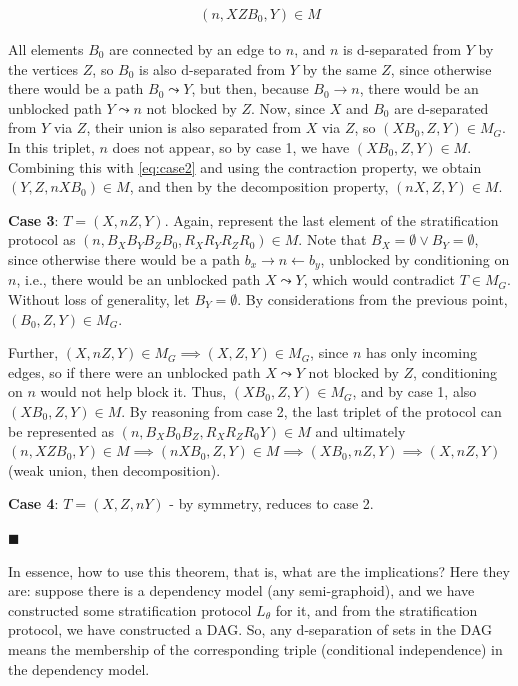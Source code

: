 \documentclass[fleqn]{article}
\numberwithin{equation}{section}
\numberwithin{theorem}{section}
\numberwithin{figure}{section}
\numberwithin{lemma}{section}
\numberwithin{corollary}{section}
\begin{document}
\begin{align}
	(n, X Z B_0, Y) \in M
	\label{eq:case2}
\end{align}

All elements \( B_0 \) are connected by an edge to \( n \), and \( n \) is d-separated from \( Y \) by the vertices \( Z \), so \( B_0 \) is also d-separated from \( Y \) by the same \( Z \), since otherwise there would be a path \( B_0 \leadsto Y \), but then, because \( B_0 \rightarrow n \), there would be an unblocked path \( Y \leadsto n \) not blocked by \( Z \). Now, since \( X \) and \( B_0 \) are d-separated from \( Y \) via \( Z \), their union is also separated from \( X \) via \( Z \), so \( (X B_0, Z, Y) \in M_G \). In this triplet, \( n \) does not appear, so by case 1, we have \( (X B_0, Z, Y) \in M \). Combining this with \ref{eq:case2} and using the contraction property, we obtain \( (Y, Z, n X B_0) \in M \), and then by the decomposition property, \( (n X, Z, Y) \in M \).

\textbf{Case 3}: \( T = (X, n Z, Y) \). Again, represent the last element of the stratification protocol as \( (n, B_X B_Y B_Z B_0, R_X R_Y R_Z R_0) \in M \). Note that \( B_X = \emptyset \lor B_Y = \emptyset \), since otherwise there would be a path \( b_x \rightarrow n \leftarrow b_y \), unblocked by conditioning on \( n \), i.e., there would be an unblocked path \( X \leadsto Y \), which would contradict \( T \in M_G \). Without loss of generality, let \( B_Y = \emptyset \). By considerations from the previous point, \( (B_0, Z, Y) \in M_G \).

Further, \( (X, n Z, Y) \in M_G \implies (X, Z, Y) \in M_G \), since \( n \) has only incoming edges, so if there were an unblocked path \( X \leadsto Y \) not blocked by \( Z \), conditioning on \( n \) would not help block it. Thus, \( (X B_0, Z, Y) \in M_G \), and by case 1, also \( (X B_0, Z, Y) \in M \). By reasoning from case 2, the last triplet of the protocol can be represented as \( (n, B_X B_0 B_Z, R_X R_Z R_0 Y) \in M \) and ultimately \( (n, X Z B_0, Y) \in M \implies (n X B_0, Z, Y) \in M \implies (X B_0, n Z, Y) \implies (X, n Z, Y) \) (weak union, then decomposition).

\textbf{Case 4}: \( T = (X, Z, n Y) \) - by symmetry, reduces to case 2.

\(\blacksquare\)

\begin{tcolorbox}
	In essence, how to use this theorem, that is, what are the implications? Here they are: suppose there is a dependency model (any semi-graphoid), and we have constructed some stratification protocol \( L_\theta \) for it, and from the stratification protocol, we have constructed a DAG. So, any d-separation of sets in the DAG means the membership of the corresponding triple (conditional independence) in the dependency model.
\end{tcolorbox}
\end{document}

